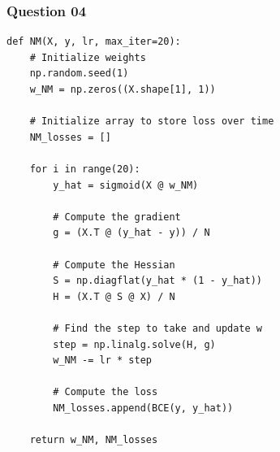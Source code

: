 \documentclass{article}[a4paper]
\begin{document}
	\subsubsection{Question 04}
	\begin{lstlisting}[caption={Newton's Method}, label=nm]
def NM(X, y, lr, max_iter=20):
    # Initialize weights
    np.random.seed(1)
    w_NM = np.zeros((X.shape[1], 1))

    # Initialize array to store loss over time
    NM_losses = []

    for i in range(20):
        y_hat = sigmoid(X @ w_NM)
        
        # Compute the gradient
        g = (X.T @ (y_hat - y)) / N

        # Compute the Hessian
        S = np.diagflat(y_hat * (1 - y_hat))
        H = (X.T @ S @ X) / N

        # Find the step to take and update w
        step = np.linalg.solve(H, g)
        w_NM -= lr * step

        # Compute the loss
        NM_losses.append(BCE(y, y_hat))
    
    return w_NM, NM_losses
	\end{lstlisting}
\end{document}
